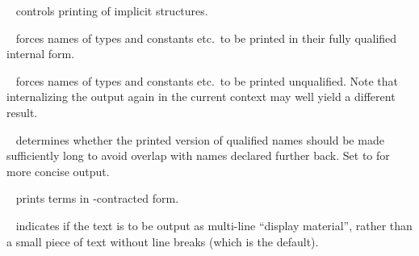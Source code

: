 \begin{isabellebody}
\begin{isamarkuptext}
\begin{description}
  \item {}\hypertarget{antiquotation option.show-structs}{\hyperlink{antiquotation option.show-structs}{\mbox{}}}~
  controls printing of implicit structures.

  \item {}\hypertarget{antiquotation option.long-names}{\hyperlink{antiquotation option.long-names}{\mbox{}}}~ forces
  names of types and constants etc.\ to be printed in their fully
  qualified internal form.

  \item {}\hypertarget{antiquotation option.short-names}{\hyperlink{antiquotation option.short-names}{\mbox{}}}~
  forces names of types and constants etc.\ to be printed unqualified.
  Note that internalizing the output again in the current context may
  well yield a different result.

  \item {}\hypertarget{antiquotation option.unique-names}{\hyperlink{antiquotation option.unique-names}{\mbox{}}}~
  determines whether the printed version of qualified names should be
  made sufficiently long to avoid overlap with names declared further
  back.  Set to  for more concise output.

  \item {}\hypertarget{antiquotation option.eta-contract}{\hyperlink{antiquotation option.eta-contract}{\mbox{}}}~
  prints terms in \isa{{\isasymeta}}-contracted form.

  \item {}\hypertarget{antiquotation option.display}{\hyperlink{antiquotation option.display}{\mbox{}}}~ indicates
  if the text is to be output as multi-line ``display material'',
  rather than a small piece of text without line breaks (which is the
  default).


\end{description}
\end{isamarkuptext}
\end{isabellebody}
